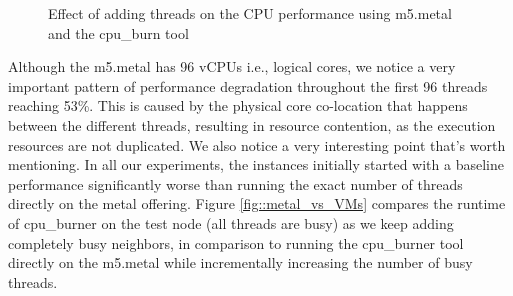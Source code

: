 \begin{figure}[H]
\centering
{}
\caption{Effect of adding threads on the CPU performance using m5.metal and the cpu\_burn tool} 
\end{figure}
\noindent
Although the m5.metal has 96 vCPUs i.e., logical cores, we 
notice a very important pattern of performance degradation throughout the first 96 threads reaching 53\%. 
This is caused by the physical core co-location that happens between the different 
threads, resulting in resource contention, as the execution resources are not duplicated. 
We also notice a very interesting point that's worth mentioning. In all our experiments, the instances 
initially started with a baseline performance significantly worse than running the exact number of threads 
directly on the metal offering. Figure \ref{fig::metal_vs_VMs} compares the runtime of cpu\_burner on the test node 
(all threads are busy) as we keep adding completely busy neighbors, in comparison to running the cpu\_burner 
tool directly on the m5.metal while incrementally increasing the number of busy threads.

